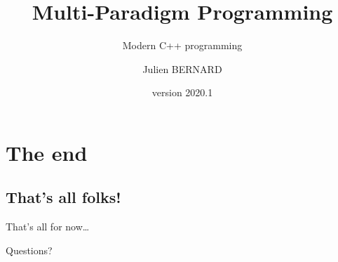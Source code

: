 \documentclass[english,10pt]{beamer}
\title{Multi-Paradigm Programming}
\subtitle{Modern C++ programming}
\author{Julien BERNARD}
\institute[Univ. Franche-Comté]{Université de Franche-Comté, France}
\date{version 2020.1}
\begin{document}
\begin{frame}
  \titlepage
\end{frame}









\section*{The end}

\subsection*{That's all folks!}

\begin{frame}{That's all for now\ldots}{}
  \begin{block}{}
    \begin{center}
      Questions?
    \end{center}
  \end{block}
\end{frame}


\end{document}
